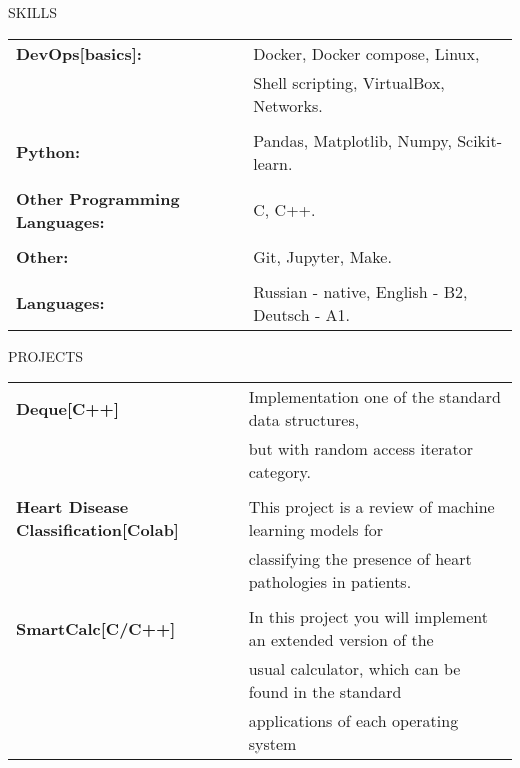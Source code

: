 \documentclass{resume} %
\begin{document}
\begin{rSection}{SKILLS}

\begin{tabular}{ @{} >{\bfseries}l @{\hspace{6ex}} l }
DevOps[basics]: & Docker, Docker compose, Linux, \\
\ &              Shell scripting, VirtualBox, Networks.\\ \\
Python: & Pandas, Matplotlib, Numpy, Scikit-learn. \\  \\
Other Programming Languages: &  C, C++.  \\ \\
Other: &         Git, Jupyter, Make. \\ \\
Languages: & Russian - native, English - B2, Deutsch - A1.

\end{tabular}

\end{rSection}

\begin{rSection}{PROJECTS}

\begin{tabular}{ @{} >{\bfseries}l @{\hspace{6ex}} l }
Deque[C++] & Implementation one of the standard data structures, \\ \ & but with random access iterator category. \\ \\
Heart Disease Classification[Colab] & This project is a review of machine learning models for \\
\ & classifying the presence of heart pathologies in patients. \\ \\
SmartCalc[C/C++] & In this project you will implement an extended version of the \\ \ & usual calculator,  which can be found in the standard \\ \ & applications of each operating system




\end{tabular}

\end{rSection}


\end{document}

